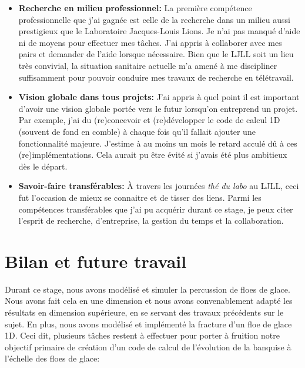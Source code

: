 \begin{itemize}
    \item \textbf{Recherche en milieu professionnel:} La première compétence professionnelle que j'ai gagnée est celle de la recherche dans un milieu aussi prestigieux que le Laboratoire Jacques-Louis Lions. Je n'ai pas manqué d'aide ni de moyens pour effectuer mes tâches. J'ai appris à collaborer avec mes pairs et demander de l'aide lorsque nécessaire. Bien que le LJLL soit un lieu très convivial, la situation sanitaire actuelle m'a amené à me discipliner suffisamment pour pouvoir conduire mes travaux de recherche en télétravail.
    \item \textbf{Vision globale dans tous projets:} J'ai appris à quel point il est important d'avoir une vision globale portée vers le futur lorsqu'on entreprend un projet. Par exemple, j'ai du (re)concevoir et (re)développer le code de calcul 1D (souvent de fond en comble) à chaque fois qu'il fallait ajouter une fonctionnalité majeure. J'estime à au moins un mois le retard acculé dû à ces (re)implémentations. Cela aurait pu être évité si j'avais été plus ambitieux dès le départ.
    \item \textbf{Savoir-faire transférables:} À travers les journées \emph{thé du labo} au LJLL, ceci fut l'occasion de mieux se connaitre et de tisser des liens. Parmi les compétences transférables que j'ai pu acquérir durant ce stage, je peux citer l'esprit de recherche, d'entreprise, la gestion du temps et la collaboration.
\end{itemize}










\section{Bilan et future travail}

Durant ce stage, nous avons modélisé et simuler la percussion de floes de glace. Nous avons fait cela en une dimension et nous avons convenablement adapté les résultats en dimension supérieure, en se servant des travaux précédents sur le sujet. En plus, nous avons modélisé et implémenté la fracture d'un floe de glace 1D. Ceci dit, plusieurs tâches restent à effectuer pour porter à fruition notre objectif primaire de création d'un code de calcul de l’évolution de la banquise à l’échelle des floes de glace:

